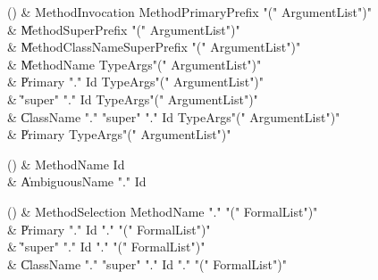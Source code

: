 \begin{bbgrammarappendix}

() & MethodInvocation \label{prod:MethodInvocation}  \: MethodPrimaryPrefix \xcd"(" ArgumentList\opt \xcd")"  \\

 &    \| MethodSuperPrefix \xcd"(" ArgumentList\opt \xcd")" \\
 &    \| MethodClassNameSuperPrefix \xcd"(" ArgumentList\opt \xcd")" \\
 &    \| MethodName TypeArgs\opt \xcd"(" ArgumentList\opt \xcd")" \\
 &    \| Primary \xcd"." Id TypeArgs\opt \xcd"(" ArgumentList\opt \xcd")" \\
 &    \| \xcd"super" \xcd"." Id TypeArgs\opt \xcd"(" ArgumentList\opt \xcd")" \\
 &    \| ClassName \xcd"." \xcd"super"  \xcd"." Id TypeArgs\opt \xcd"(" ArgumentList\opt \xcd")" \\
 &    \| Primary TypeArgs\opt \xcd"(" ArgumentList\opt \xcd")" \\

\end{bbgrammarappendix}

\begin{bbgrammarappendix}

() & MethodName \label{prod:MethodName}  \: Id  \\

 &    \| AmbiguousName \xcd"." Id \\

\end{bbgrammarappendix}

\begin{bbgrammarappendix}

() & MethodSelection \label{prod:MethodSelection}  \: MethodName \xcd"." \xcd"(" FormalList\opt \xcd")"  \\

 &    \| Primary \xcd"." Id \xcd"." \xcd"(" FormalList\opt \xcd")" \\
 &    \| \xcd"super" \xcd"." Id \xcd"." \xcd"(" FormalList\opt \xcd")" \\
 &    \| ClassName \xcd"." \xcd"super"  \xcd"." Id \xcd"." \xcd"(" FormalList\opt \xcd")" \\

\end{bbgrammarappendix}


